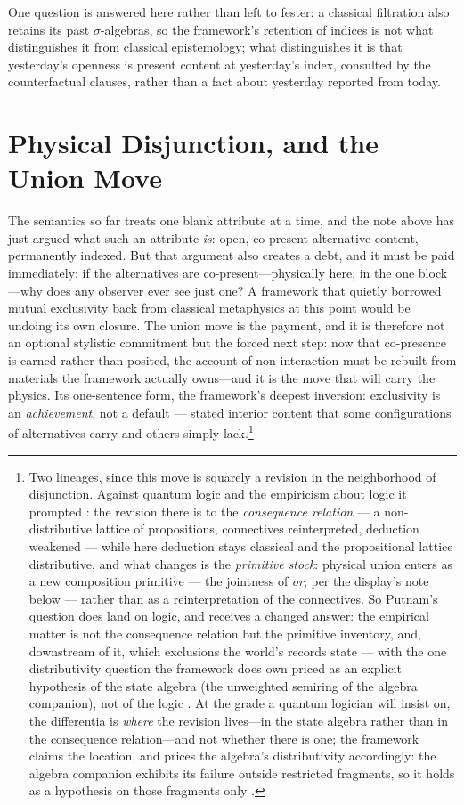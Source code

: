 \documentclass[11pt]{article}
\theoremstyle{definition}
\begin{document}
One question is answered here rather than left to fester: a classical filtration also retains its past $\sigma$-algebras, so the framework's retention of indices is not what distinguishes it from classical epistemology; what distinguishes it is that yesterday's openness is present content at yesterday's index, consulted by the counterfactual clauses, rather than a fact about yesterday reported from today.



\section{Physical Disjunction, and the Union Move}\label{sec:union} The semantics so far treats one blank attribute at a time, and the note above has just argued what such an attribute \emph{is}: open, co-present alternative content, permanently indexed. But that argument also creates a debt, and it must be paid immediately: if the alternatives are co-present---physically here, in the one block---why does any observer ever see just one? A framework that quietly borrowed mutual exclusivity back from classical metaphysics at this point would be undoing its own closure. The union move is the payment, and it is therefore not an optional stylistic commitment but the forced next step: now that co-presence is earned rather than posited, the account of non-interaction must be rebuilt from materials the framework actually owns---and it is the move that will carry the physics. Its one-sentence form, the framework's deepest inversion: exclusivity is an \emph{achievement}, not a default --- stated interior content that some configurations of alternatives carry and others simply lack.\footnote{Two lineages, since this move is squarely a revision in the neighborhood of disjunction. Against quantum logic \cite{birkhoff1936} and the empiricism about logic it prompted \cite{putnam1968}: the revision there is to the \emph{consequence relation} --- a non-distributive lattice of propositions, connectives reinterpreted, deduction weakened --- while here deduction stays classical and the propositional lattice distributive, and what changes is the \emph{primitive stock}: physical union enters as a new composition primitive --- the jointness of \emph{or}, per the display's note below --- rather than as a reinterpretation of the connectives. So Putnam's question does land on logic, and receives a changed answer: the empirical matter is not the consequence relation but the primitive inventory, and, downstream of it, which exclusions the world's records state --- with the one distributivity question the framework does own priced as an explicit hypothesis of the state algebra (the unweighted semiring of the algebra companion), not of the logic \cite{Aethus}.
At the grade a quantum logician will insist on, the differentia is \emph{where} the revision lives---in the state algebra rather than in the consequence relation---and not whether there is one; the framework claims the location, and prices the algebra's distributivity accordingly: the algebra companion exhibits its failure outside restricted fragments, so it holds as a hypothesis on those fragments only \cite{AethusTree}.}
\end{document}
